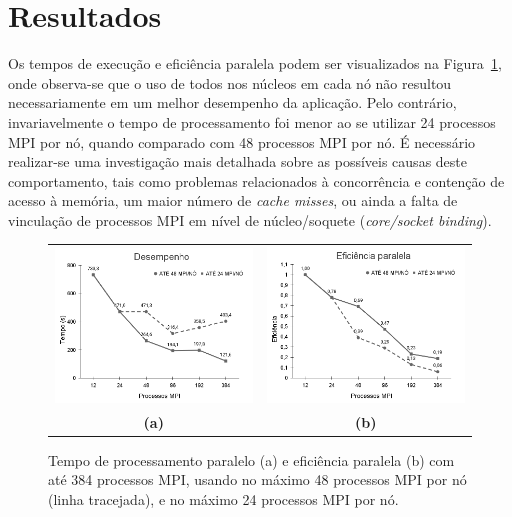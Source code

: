 \documentclass[12pt]{article}
\begin{document}
\section{Resultados}
%
Os tempos de execução e eficiência paralela podem ser visualizados na Figura~\ref{fig:perfpernode}, onde observa-se que o uso de todos nos núcleos em cada nó não resultou necessariamente em um melhor desempenho da aplicação. Pelo contrário, invariavelmente o tempo de processamento foi menor ao se utilizar 24 processos MPI por nó, quando comparado com 48 processos MPI por nó. É necessário realizar-se uma investigação mais detalhada sobre as possíveis causas deste comportamento, tais como problemas relacionados à concorrência e contenção de acesso à memória, um maior número de \textit{cache misses}, ou ainda a falta de vinculação de processos MPI em nível de núcleo/soquete (\textit{core/socket binding}).

\begin{figure}[ht]
\centering
\begin{tabular}{cc}
\includegraphics[width=.5\textwidth]{figures/perfpernode.png}&\includegraphics[width=.5\textwidth]{figures/eficiencia.png} \\
 \textbf{(a)} & \textbf{(b)}
\end{tabular}
\caption{Tempo de processamento paralelo (a) e eficiência paralela (b) com até 384 processos MPI, usando no máximo 48 processos MPI por nó (linha tracejada), e no máximo 24 processos MPI por nó.}
\label{fig:perfpernode}
\end{figure}
\end{document}
